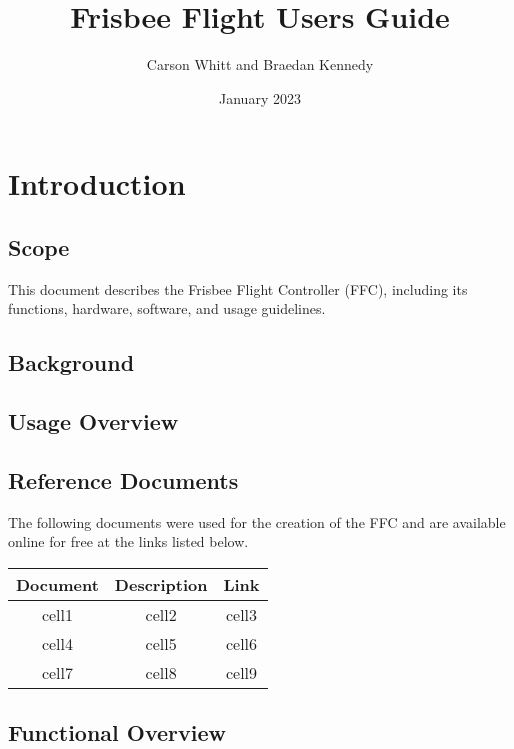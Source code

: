 \documentclass[12pt, letterpaper]{article}
\title{Frisbee Flight Users Guide}
\author{Carson Whitt and Braedan Kennedy}
\date{January 2023}
\begin{document}
\maketitle
\tableofcontents
\newpage

\section{Introduction}\label{section:intro}

\subsection{Scope}
This document describes the Frisbee Flight Controller (FFC), including its functions, hardware,
software, and usage guidelines.

\subsection{Background}

\subsection{Usage Overview}

\subsection{Reference Documents}
The following documents were used for the creation of the FFC and are available online for free at
the links listed below.
\begin{table}[h]
    \centering
    \begin{tabular}{ccc}
    \toprule
    \textbf{Document} & \textbf{Description} &\textbf{Link} \\
    \midrule
    cell1&cell2 & cell3\\
    cell4&cell5 & cell6\\
    cell7&cell8 & cell9\\
    \bottomrule
    \end{tabular}
\end{table}

\subsection{Functional Overview}
\end{document}
